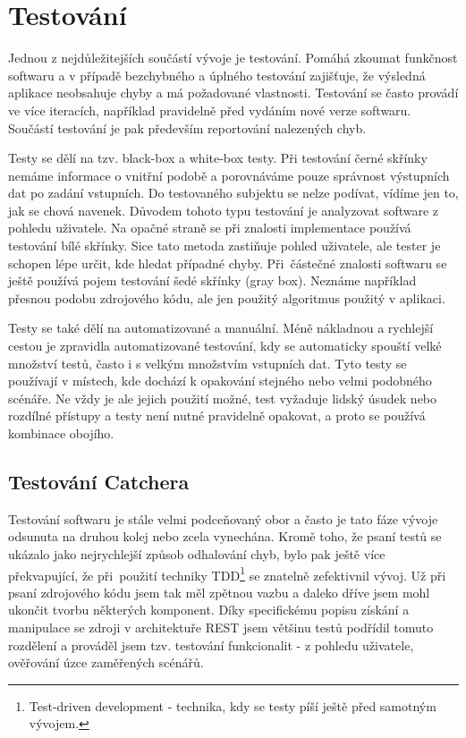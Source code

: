 \chapter{Testování}

\indent

Jednou z nejdůležitejších součástí vývoje je testování. Pomáhá zkoumat funkčnost softwaru a v případě bezchybného
a úplného testování zajišťuje, že výsledná aplikace neobsahuje chyby a má požadované vlastnosti.
Testování se často provádí ve více iteracích, například pravidelně před vydáním nové verze softwaru.
Součástí testování je pak především reportování nalezených chyb.

\medskip

Testy se dělí na tzv. black-box a white-box testy. Při testování černé skřínky nemáme informace o vnitřní podobě a porovnáváme
pouze správnost výstupních dat po zadání vstupních. Do testovaného subjektu se nelze podívat, vídíme jen to, jak se chová navenek.
Důvodem tohoto typu testování je analyzovat software z pohledu uživatele.
Na opačné straně se při znalosti implementace používá testování bílé skřínky. Sice tato metoda zastiňuje pohled uživatele,
ale tester je schopen lépe určit, kde hledat případné chyby. Při~částečné znalosti softwaru se ještě používá pojem testování šedé skřínky (gray box).
Neznáme například přesnou podobu zdrojového kódu, ale jen použitý algoritmus použitý v aplikaci. 


\medskip

Testy se také dělí na automatizované a manuální. Méně nákladnou a rychlejší cestou je zpravidla automatizované testování,
kdy se automaticky spouští velké množství testů, často i s velkým množstvím vstupních dat. Tyto testy se používají v místech,
kde dochází k opakování stejného nebo velmi podobného scénáře. Ne vždy je ale jejich použití možné, test vyžaduje lidský úsudek
nebo rozdílné přístupy a testy není nutné pravidelně opakovat, a proto se používá kombinace obojího. 

\section{Testování Catchera}

\indent

Testování softwaru je stále velmi podceňovaný obor a často je tato fáze vývoje odsunuta na druhou kolej nebo zcela vynechána.
Kromě toho, že psaní testů se ukázalo jako nejrychlejší způsob odhalování chyb, bylo pak ještě více překvapující, že při~použití
techniky TDD\footnote{Test-driven development - technika, kdy se testy píší ještě před samotným vývojem.} se znatelně zefektivnil
vývoj. Už při psaní zdrojového kódu jsem tak měl zpětnou vazbu a daleko dříve jsem mohl ukončit tvorbu některých komponent.
Díky specifickému popisu získání a manipulace se zdroji v architektuře REST jsem většinu testů podřídil tomuto rozdělení a prováděl
jsem tzv. testování funkcionalit - z pohledu uživatele, ověřování úzce zaměřených scénářů.

